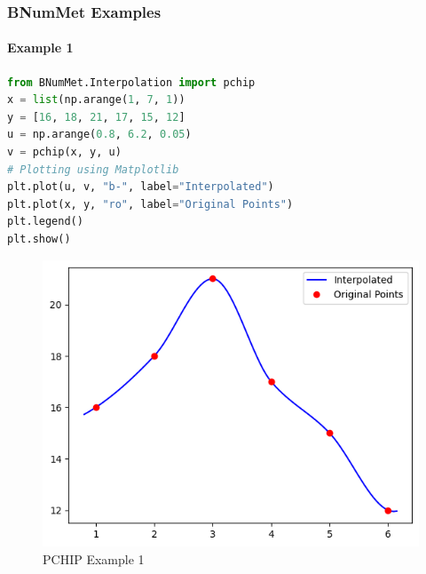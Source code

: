 \subsubsection{BNumMet Examples}
\paragraph{Example 1}{
\begin{lstlisting}[language=Python]
from BNumMet.Interpolation import pchip
x = list(np.arange(1, 7, 1))
y = [16, 18, 21, 17, 15, 12]
u = np.arange(0.8, 6.2, 0.05)
v = pchip(x, y, u)
# Plotting using Matplotlib
plt.plot(u, v, "b-", label="Interpolated")
plt.plot(x, y, "ro", label="Original Points")
plt.legend()
plt.show()
\end{lstlisting}

\begin{figure}[H]
    \centering
    \includegraphics{Include/Images/Thesis/Documentation/Interpolation/PCHIP Example 1.png}
    \caption{PCHIP Example 1}
    \label{fig:PCHIP Example 1}
\end{figure}
}


